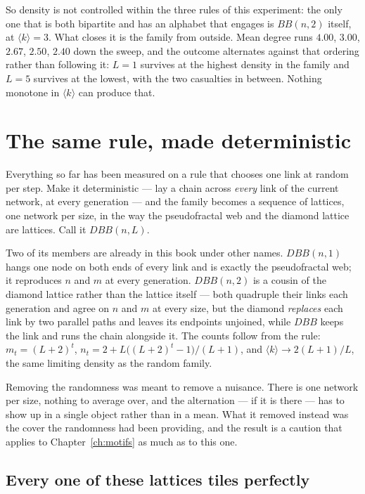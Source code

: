 So density is not controlled within the three rules of this experiment: the only
one that is both bipartite and has an alphabet that engages is $BB(n,2)$ itself,
at $\langle k\rangle=3$. What closes it is the family from outside. Mean degree
runs $4.00$, $3.00$, $2.67$, $2.50$, $2.40$ down the sweep, and the outcome
alternates against that ordering rather than following it: $L=1$ survives at the
highest density in the family and $L=5$ survives at the lowest, with the two
casualties in between. Nothing monotone in $\langle k\rangle$ can produce that.

\section{The same rule, made deterministic}
\label{sec:bb-deterministic}

Everything so far has been measured on a rule that chooses one link at random per
step. Make it deterministic --- lay a chain across \emph{every} link of the
current network, at every generation --- and the family becomes a sequence of
lattices, one network per size, in the way the pseudofractal web and the diamond
lattice are lattices. Call it $DBB(n,L)$.

Two of its members are already in this book under other names. $DBB(n,1)$ hangs
one node on both ends of every link and is exactly the pseudofractal web; it
reproduces $n$ and $m$ at every generation. $DBB(n,2)$ is a cousin of the diamond
lattice rather than the lattice itself --- both quadruple their links each
generation and agree on $n$ and $m$ at every size, but the diamond \emph{replaces}
each link by two parallel paths and leaves its endpoints unjoined, while $DBB$
keeps the link and runs the chain alongside it. The counts follow from the rule:
$m_t=(L+2)^t$, $n_t = 2 + L\big((L+2)^t-1\big)/(L+1)$, and
$\langle k\rangle\to 2(L+1)/L$, the same limiting density as the random family.

Removing the randomness was meant to remove a nuisance. There is one network per
size, nothing to average over, and the alternation --- if it is there --- has to
show up in a single object rather than in a mean. What it removed instead was the
cover the randomness had been providing, and the result is a caution that applies
to Chapter~\ref{ch:motifs} as much as to this one.

\subsection*{Every one of these lattices tiles perfectly}

